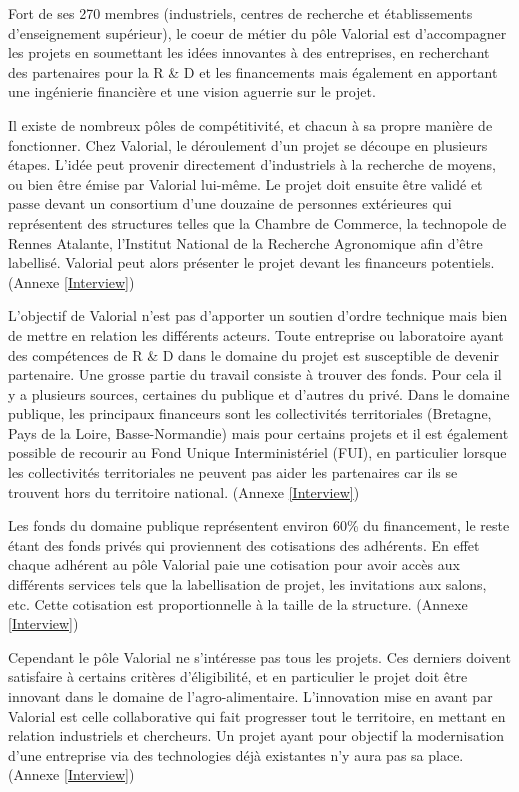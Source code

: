 \documentclass[a4paper,12pt]{report}
\begin{document}
			 Fort de ses 270 membres (industriels, centres de recherche et établissements d’enseignement supérieur), le coeur de métier du pôle Valorial est d’accompagner les projets en soumettant les idées innovantes à des entreprises, en recherchant des partenaires pour la R \& D et les financements mais également en apportant une ingénierie financière et une vision aguerrie sur le projet. 
			
			 Il existe de nombreux pôles de compétitivité, et chacun à sa propre manière de fonctionner. Chez Valorial, le déroulement d’un projet se découpe en plusieurs étapes. L’idée peut provenir directement d’industriels à la recherche de moyens, ou bien être émise par Valorial lui-même. Le projet doit ensuite être validé et passe devant un consortium d’une douzaine de personnes extérieures qui représentent des structures telles que la Chambre de Commerce, la technopole de Rennes Atalante, l’Institut National de la Recherche Agronomique afin d’être labellisé. Valorial peut alors présenter le projet devant les financeurs potentiels. (Annexe \ref{Interview})

			L’objectif de Valorial n’est pas d’apporter un soutien d’ordre technique mais bien de mettre en relation les différents acteurs. Toute entreprise ou laboratoire ayant des compétences de R \& D dans le domaine du projet est susceptible de devenir partenaire. Une grosse partie du travail consiste à trouver des fonds. Pour cela il y a plusieurs sources, certaines du publique et d’autres du privé. Dans le domaine publique, les principaux financeurs sont les collectivités territoriales (Bretagne, Pays de la Loire, Basse-Normandie) mais pour certains projets et il est également possible de recourir au Fond Unique Interministériel (FUI), en particulier lorsque les collectivités territoriales ne peuvent pas aider les partenaires car ils se trouvent hors du territoire national. (Annexe \ref{Interview})

			Les fonds du domaine publique représentent environ 60\% du financement, le reste étant des fonds privés qui proviennent des cotisations des adhérents. En effet chaque adhérent au pôle Valorial paie une cotisation pour avoir accès aux différents services tels que la labellisation de projet, les invitations aux salons, etc. Cette cotisation est proportionnelle à la taille de la structure.  (Annexe \ref{Interview})
    
    			Cependant le pôle Valorial ne s’intéresse pas tous les projets. Ces derniers doivent satisfaire à certains critères d'éligibilité, et en particulier le projet doit être innovant dans le domaine de l’agro-alimentaire. L’innovation mise en avant par Valorial est celle collaborative qui fait progresser tout le territoire, en mettant en relation industriels et chercheurs. Un projet ayant pour objectif la modernisation d’une entreprise via des technologies déjà existantes n’y aura pas sa place. (Annexe \ref{Interview})
\end{document}
